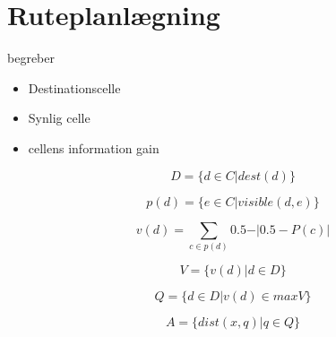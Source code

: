 \section{Ruteplanlægning}

\begin{frame}{begreber}

\begin{itemize}
\item Destinationscelle
\item Synlig celle
\item cellens information gain
\end{itemize}

\end{frame}



\begin{frame}

$$D = \{d \in C \vert dest(d) \}$$

$$p(d) = \{e \in C \vert visible(d,e) \}$$

$$v(d) = \sum_{c \in p(d)}{0.5- \vert 0.5 - P(c) \vert}$$

\end{frame}


\begin{frame}

$$V = \{v(d) \vert d \in D \}$$

$$Q = \{ d \in D \vert v(d) \in maxV \}$$

$$A = \{dist(x,q) \vert q \in Q \}$$


\end{frame}

